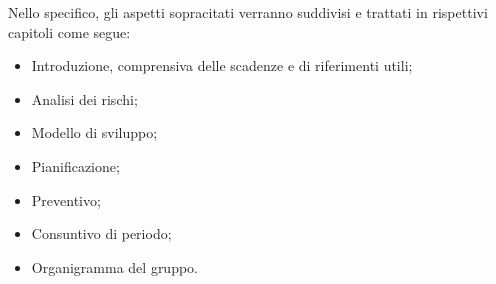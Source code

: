 Nello specifico, gli aspetti sopracitati verranno suddivisi e trattati in rispettivi capitoli come segue:
    \begin{itemize}
        \item Introduzione, comprensiva delle scadenze e di riferimenti utili;
        \item Analisi dei rischi;
        \item Modello di sviluppo;
        \item Pianificazione;
        \item Preventivo;
        \item Consuntivo di periodo;
        \item Organigramma del gruppo.
    \end{itemize}